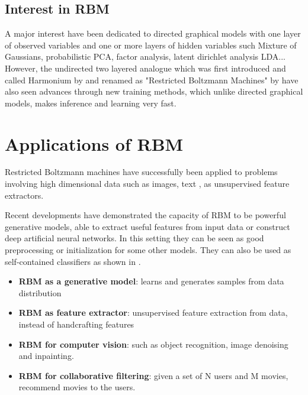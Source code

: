\documentclass{article}
\begin{document}

\subsection{Interest in RBM}

A major interest have been dedicated to directed graphical models with one layer of observed variables and one or more layers of hidden variables such Mixture of Gaussians, probabilistic PCA, factor analysis, latent dirichlet analysis LDA... However, the undirected two layered analogue which was first introduced and called Harmonium by \cite{smolensky1986information} and renamed as "Restricted Boltzmann Machines" by \cite{hinton2002training} have also seen advances through new training methods, which unlike directed graphical models, makes inference and learning very fast. 


\section{Applications of RBM}
Restricted Boltzmann machines have successfully been applied to problems involving high dimensional data such as images, text  \cite{hinton2006fast}, \cite{vincent2010stacked} as unsupervised feature extractors.

Recent developments have demonstrated the capacity of RBM to be powerful generative models, able to extract useful features from input data or construct deep artificial neural networks. In this setting they can be seen as good preprocessing or initialization for some other models. They can also be used as self-contained classifiers as shown in \cite{larochelle2012learning}.

\begin{itemize}
		\item \textbf{RBM as a generative model}: learns and generates samples from data distribution 
		\item \textbf{RBM as feature extractor}: unsupervised feature extraction from data, instead of handcrafting features 
		\item \textbf{RBM for computer vision}: such as object recognition, image denoising and inpainting.
		\item \textbf{RBM for collaborative filtering}: given a set of N users and M movies, recommend movies to the users.
	\end{itemize}
\end{document}
